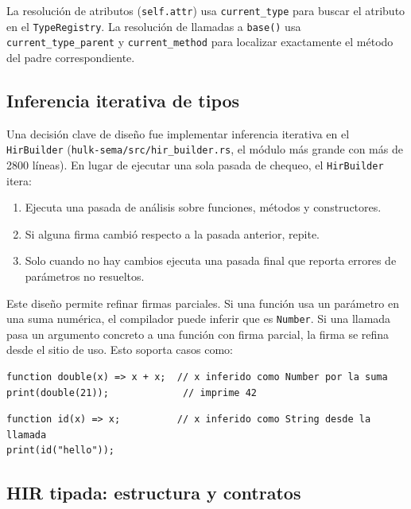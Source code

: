 \documentclass[12pt,letterpaper]{article}
\newcommand{\src}[1]{\texttt{#1}}
\begin{document}
La resolución de atributos (\src{self.attr}) usa \src{current\_type} para buscar el atributo en el \src{TypeRegistry}. La resolución de llamadas a \src{base()} usa \src{current\_type\_parent} y \src{current\_method} para localizar exactamente el método del padre correspondiente.

\subsection{Inferencia iterativa de tipos}

Una decisión clave de diseño fue implementar inferencia iterativa en el \src{HirBuilder} (\src{hulk-sema/src/hir\_builder.rs}, el módulo más grande con más de 2800 líneas). En lugar de ejecutar una sola pasada de chequeo, el \src{HirBuilder} itera:

\begin{enumerate}[label=\arabic*.]
    \item Ejecuta una pasada de análisis sobre funciones, métodos y constructores.
    \item Si alguna firma cambió respecto a la pasada anterior, repite.
    \item Solo cuando no hay cambios ejecuta una pasada final que reporta errores de parámetros no resueltos.
\end{enumerate}

Este diseño permite refinar firmas parciales. Si una función usa un parámetro en una suma numérica, el compilador puede inferir que es \src{Number}. Si una llamada pasa un argumento concreto a una función con firma parcial, la firma se refina desde el sitio de uso. Esto soporta casos como:

\begin{lstlisting}[language=HULK,caption={Inferencia desde el cuerpo}]
function double(x) => x + x;  // x inferido como Number por la suma
print(double(21));             // imprime 42
\end{lstlisting}

\begin{lstlisting}[language=HULK,caption={Inferencia desde el sitio de llamada}]
function id(x) => x;          // x inferido como String desde la llamada
print(id("hello"));
\end{lstlisting}

\subsection{HIR tipada: estructura y contratos}
\end{document}

